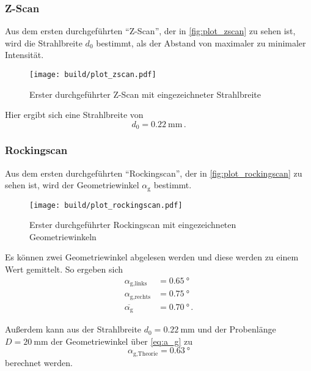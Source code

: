 \subsubsection{Z-Scan}
\label{sssec:Z-Scan}

Aus dem ersten durchgeführten \enquote{Z-Scan}, der in \autoref{fig:plot_zscan} zu sehen ist,
wird die Strahlbreite $d_0$ bestimmt, als der Abstand von maximaler zu minimaler Intensität.

\begin{figure}
    \centering
    \texttt{[image: build/plot\_zscan.pdf]}
    \caption{Erster durchgeführter Z-Scan mit eingezeichneter Strahlbreite}
    \label{fig:plot_zscan}
\end{figure}

Hier ergibt sich eine Strahlbreite von
\begin{equation*}
    d_0 = \SI{0.22}{\milli\meter} \, .
\end{equation*}

\subsubsection{Rockingscan}
\label{sssec:Rockingscan}

Aus dem ersten durchgeführten \enquote{Rockingscan}, der in \autoref{fig:plot_rockingscan} zu sehen ist,
wird der Geometriewinkel $\alpha_\text{g}$ bestimmt.

\begin{figure}
    \centering
    \texttt{[image: build/plot\_rockingscan.pdf]}
    \caption{Erster durchgeführter Rockingscan mit eingezeichneten Geometriewinkeln}
    \label{fig:plot_rockingscan}
\end{figure}

Es können zwei Geometriewinkel abgelesen werden und diese werden zu einem Wert gemittelt.
So ergeben sich
\begin{align*}
    \alpha_\text{g,links} &= \SI{0.65}{\degree} \\
    \alpha_\text{g,rechts} &= \SI{0.75}{\degree} \\
    \overline{\alpha_\text{g}} &= \SI{0.70}{\degree} \, .
\end{align*}

Außerdem kann aus der Strahlbreite $d_0 = \SI{0.22}{\milli\meter}$ und der Probenlänge $D = \SI{20}{\milli\meter}$
der Geometriewinkel über \autoref{eq:a_g} zu
\begin{equation*}
    \alpha_\text{g,Theorie} = \SI{0.63}{\degree}
\end{equation*}
berechnet werden. 

